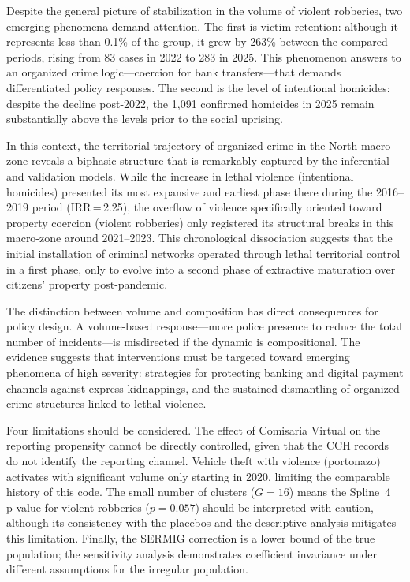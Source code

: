 \documentclass[pdflatex,sn-basic]{sn-jnl}
\begin{document}
Despite the general picture of stabilization in the volume of violent robberies, two
emerging phenomena demand attention. The first is victim retention:
although it represents less than 0.1\% of the group, it grew by 263\% between the
compared periods, rising from 83 cases in 2022 to 283 in 2025. This phenomenon answers to
an organized crime logic---coercion for bank transfers---that
demands differentiated policy responses. The second is the level of intentional
homicides: despite the decline post-2022, the 1,091 confirmed homicides in 2025
remain substantially above the levels prior to the social uprising.

In this context, the territorial trajectory of organized crime in the North macro-zone
reveals a biphasic structure that is remarkably captured by the inferential and validation models.
While the increase in lethal violence (intentional homicides) presented its most
expansive and earliest phase there during the 2016--2019 period (IRR\,=\,2.25), the overflow
of violence specifically oriented toward property coercion (violent robberies)
only registered its structural breaks in this macro-zone around 2021--2023. This
chronological dissociation suggests that the initial installation of criminal networks operated
through lethal territorial control in a first phase, only to evolve into a
second phase of extractive maturation over citizens' property post-pandemic.

The distinction between volume and composition has direct consequences for policy
design. A volume-based response---more police presence to reduce
the total number of incidents---is misdirected if the dynamic is compositional. The
evidence suggests that interventions must be targeted toward emerging phenomena
of high severity: strategies for protecting banking and digital payment channels
against express kidnappings, and the sustained dismantling of organized crime
structures linked to lethal violence.

Four limitations should be considered. The effect of Comisaria Virtual on the
reporting propensity cannot be directly controlled, given that the CCH records
do not identify the reporting channel. Vehicle theft with violence (portonazo) activates with significant volume
only starting in 2020, limiting the comparable history of this code. The small
number of clusters ($G=16$) means the Spline~4 p-value for violent robberies
($p=0.057$) should be interpreted with caution, although its consistency with the placebos
and the descriptive analysis mitigates this limitation. Finally, the SERMIG correction
is a lower bound of the true population; the sensitivity analysis demonstrates
coefficient invariance under different assumptions for the irregular population.
\end{document}
